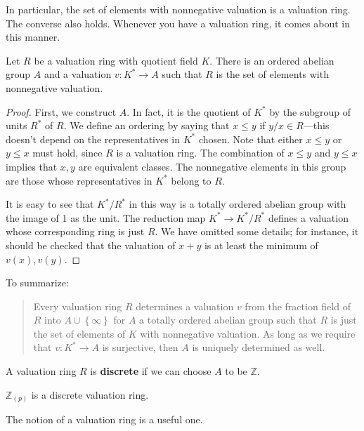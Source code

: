 In particular, the set of elements with nonnegative valuation is a valuation
ring.
The converse also holds. Whenever you have a valuation ring, it comes about in
this manner.

\begin{proposition} 
Let $R$ be a valuation ring with quotient field $K$. There is an ordered
abelian group
$A$ and a valuation $v: K^* \to A$ such that $R$ is the set of elements with
nonnegative valuation.
\end{proposition} 
\begin{proof} 
First, we construct $A$. In fact, it is the quotient of $K^*$ by the subgroup
of units  $R^*$ of $R$.  
We define an ordering by saying that $x \leq y$ if $y/x \in R$---this doesn't
depend on the representatives in $K^*$ chosen.  Note that either $x \leq y$ or
$y \leq x$ must hold, since $R$ is a valuation ring. 
The combination of $ x \leq y$ and $y \leq x$ implies that $x,y$ are equivalent
classes.
The nonnegative elements in this group are those whose representatives in $K^*$
belong to $R$.

It is easy to see that $K^*/R^*$ in this way is a totally ordered abelian group with
the image of 1 as the unit. The
reduction map $K^* \to K^*/R^*$  defines a valuation whose corresponding ring
is just $R$. We have omitted some details; for instance, it should be checked
that the valuation of $x+y$ is at least the minimum of $v(x), v(y)$. 
\end{proof} 



To summarize:
\begin{quote}
Every valuation ring $R$ determines a valuation $v$ from the fraction field of
$R$ into $A \cup \left\{\infty\right\}$ for $A$ a totally ordered abelian group
such that $R$ is just the set of elements of $K$ with nonnegative valuation. As
long as we require that $v: K^* \to A$ is surjective, then $A$ is uniquely
determined as well.
\end{quote}

\begin{definition} 
A valuation ring $R$ is \textbf{discrete} if we can choose $A$ to be
$\mathbb{Z}$. 
\end{definition} 

\begin{example} 
$\mathbb{Z}_{(p)}$ is a discrete valuation ring.  
\end{example} 

The notion of a valuation ring is a useful one.

